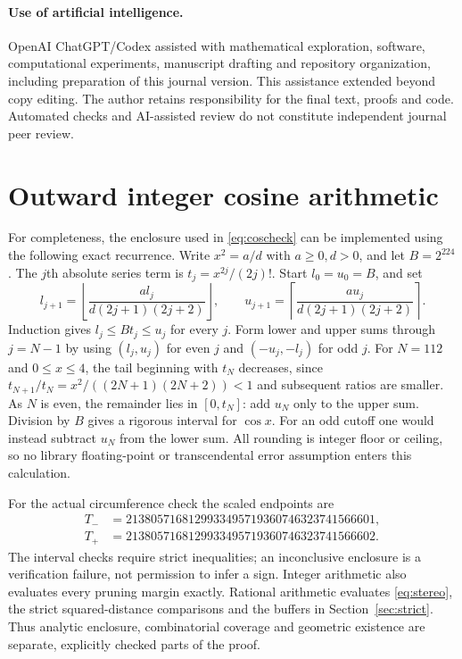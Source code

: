 \documentclass[11pt]{article}
\theoremstyle{definition}
\theoremstyle{remark}
\begin{document}
\paragraph{Use of artificial intelligence.} OpenAI ChatGPT/Codex assisted
with mathematical exploration, software, computational experiments,
manuscript drafting and repository organization, including preparation of
this journal version. This assistance extended beyond copy editing.
The author retains responsibility for the final text, proofs and code.
Automated checks and AI-assisted review do not constitute independent
journal peer review.

\appendix


\section{Outward integer cosine arithmetic}\label{app:arithmetic}
For completeness, the enclosure used in \eqref{eq:coscheck} can be
implemented using the following exact recurrence. Write $x^2=a/d$ with
$a\ge0,d>0$, and let $B=2^{224}$. The $j$th absolute series term
is $t_j=x^{2j}/(2j)!$. Start $l_0=u_0=B$, and set
\[
 l_{j+1}=\left\lfloor\frac{a l_j}{d(2j+1)(2j+2)}\right\rfloor,
 \qquad
 u_{j+1}=\left\lceil\frac{a u_j}{d(2j+1)(2j+2)}\right\rceil.
\]
Induction gives $l_j\le Bt_j\le u_j$ for every $j$. Form lower and
upper sums through $j=N-1$ by using $(l_j,u_j)$ for even $j$ and
$(-u_j,-l_j)$ for odd $j$. For $N=112$ and $0\le x\le4$, the
tail beginning with $t_N$ decreases, since
$t_{N+1}/t_N=x^2/((2N+1)(2N+2))<1$ and subsequent ratios are
smaller. As $N$ is even, the remainder lies in $[0,t_N]$: add $u_N$
only to the upper sum. Division by $B$ gives a rigorous interval for
$\cos x$. For an odd cutoff one would instead subtract $u_N$ from the
lower sum. All rounding is integer floor or ceiling, so no library
floating-point or transcendental error assumption enters this calculation.

For the actual circumference check the scaled endpoints are
\begin{align*}
T_-&=2138057168129933495719360746323741566601,\\
T_+&=2138057168129933495719360746323741566602.
\end{align*}
The interval checks require strict inequalities; an inconclusive enclosure
is a verification failure, not permission to infer a sign. Integer arithmetic
also evaluates every pruning margin exactly. Rational arithmetic evaluates
\eqref{eq:stereo}, the strict squared-distance comparisons and the buffers
in Section~\ref{sec:strict}. Thus analytic enclosure, combinatorial coverage
and geometric existence are separate, explicitly checked parts of the proof.
\end{document}
